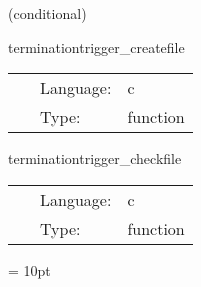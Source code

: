    (conditional) 

\hspace{5mm} terminationtrigger\_createfile 

\hspace{5mm}{\it create termination file } 


\hspace{5mm}

 \begin{tabular*}{160mm}{cll} 
~ & Language:  & c \\ 
~ & Type:  & function \\ 
\end{tabular*} 


\vspace{5mm}


\hspace{5mm} terminationtrigger\_checkfile 

\hspace{5mm}{\it check termination file } 


\hspace{5mm}

 \begin{tabular*}{160mm}{cll} 
~ & Language:  & c \\ 
~ & Type:  & function \\ 
\end{tabular*} 



\vspace{5mm}\parskip = 10pt 
